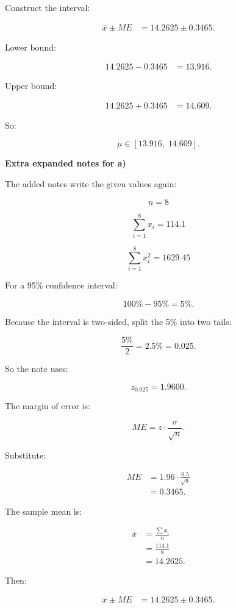 \documentclass[10pt]{article}
\begin{document}
Construct the interval:

\begin{align*}
\bar{x}\pm ME
&=14.2625\pm 0.3465.
\end{align*}

Lower bound:

\begin{align*}
14.2625-0.3465
&=13.916.
\end{align*}

Upper bound:

\begin{align*}
14.2625+0.3465
&=14.609.
\end{align*}

So:

\[
\mu\in [13.916,\;14.609].
\]

\textbf{Extra expanded notes for a)}

The added notes write the given values again:

\[
n=8
\]

\[
\sum_{i=1}^{8}x_i=114.1
\]

\[
\sum_{i=1}^{8}x_i^2=1629.45
\]

For a 95\% confidence interval:

\[
100\%-95\%=5\%.
\]

Because the interval is two-sided,
split the 5\% into two tails:

\[
\frac{5\%}{2}=2.5\%=0.025.
\]

So the note uses:

\[
z_{0.025}=1.9600.
\]

The margin of error is:

\[
ME=
z\cdot \frac{\sigma}{\sqrt{n}}.
\]

Substitute:

\begin{align*}
ME
&=
1.96\cdot
\frac{0.5}{\sqrt{8}} \\[2mm]
&=0.3465.
\end{align*}

The sample mean is:

\begin{align*}
\bar{x}
&=
\frac{\sum x_i}{n} \\[2mm]
&=
\frac{114.1}{8} \\[2mm]
&=14.2625.
\end{align*}

Then:

\begin{align*}
\bar{x}\pm ME
&=14.2625\pm 0.3465.
\end{align*}
\end{document}
